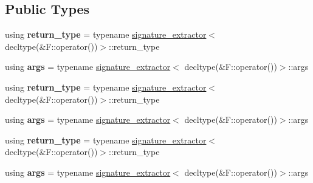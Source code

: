 \subsection*{Public Types}
\begin{DoxyCompactItemize}
\item 
\hypertarget{structtml_1_1impl_1_1function__signature_ae3dad047c3a9612218fbd9964dc8d839}{using {\bfseries return\+\_\+type} = typename \hyperlink{structtml_1_1impl_1_1function__signature_1_1signature__extractor}{signature\+\_\+extractor}$<$ decltype(\&F\+::operator())$>$\+::return\+\_\+type}\label{structtml_1_1impl_1_1function__signature_ae3dad047c3a9612218fbd9964dc8d839}

\item 
\hypertarget{structtml_1_1impl_1_1function__signature_ad5c5c13ba6252447c7eefa5d126d2ff8}{using {\bfseries args} = typename \hyperlink{structtml_1_1impl_1_1function__signature_1_1signature__extractor}{signature\+\_\+extractor}$<$ decltype(\&F\+::operator())$>$\+::args}\label{structtml_1_1impl_1_1function__signature_ad5c5c13ba6252447c7eefa5d126d2ff8}

\item 
\hypertarget{structtml_1_1impl_1_1function__signature_ae3dad047c3a9612218fbd9964dc8d839}{using {\bfseries return\+\_\+type} = typename \hyperlink{structtml_1_1impl_1_1function__signature_1_1signature__extractor}{signature\+\_\+extractor}$<$ decltype(\&F\+::operator())$>$\+::return\+\_\+type}\label{structtml_1_1impl_1_1function__signature_ae3dad047c3a9612218fbd9964dc8d839}

\item 
\hypertarget{structtml_1_1impl_1_1function__signature_ad5c5c13ba6252447c7eefa5d126d2ff8}{using {\bfseries args} = typename \hyperlink{structtml_1_1impl_1_1function__signature_1_1signature__extractor}{signature\+\_\+extractor}$<$ decltype(\&F\+::operator())$>$\+::args}\label{structtml_1_1impl_1_1function__signature_ad5c5c13ba6252447c7eefa5d126d2ff8}

\item 
\hypertarget{structtml_1_1impl_1_1function__signature_ae3dad047c3a9612218fbd9964dc8d839}{using {\bfseries return\+\_\+type} = typename \hyperlink{structtml_1_1impl_1_1function__signature_1_1signature__extractor}{signature\+\_\+extractor}$<$ decltype(\&F\+::operator())$>$\+::return\+\_\+type}\label{structtml_1_1impl_1_1function__signature_ae3dad047c3a9612218fbd9964dc8d839}

\item 
\hypertarget{structtml_1_1impl_1_1function__signature_ad5c5c13ba6252447c7eefa5d126d2ff8}{using {\bfseries args} = typename \hyperlink{structtml_1_1impl_1_1function__signature_1_1signature__extractor}{signature\+\_\+extractor}$<$ decltype(\&F\+::operator())$>$\+::args}\label{structtml_1_1impl_1_1function__signature_ad5c5c13ba6252447c7eefa5d126d2ff8}

\end{DoxyCompactItemize}
